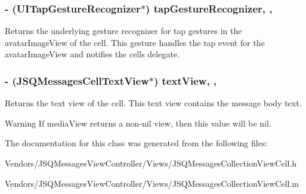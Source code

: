 \subsubsection[{tap\+Gesture\+Recognizer}]{\setlength{\rightskip}{0pt plus 5cm}-\/ (U\+I\+Tap\+Gesture\+Recognizer$\ast$) tap\+Gesture\+Recognizer\hspace{0.3cm}{\ttfamily [read]}, {\ttfamily [nonatomic]}, {\ttfamily [weak]}}\label{interface_j_s_q_messages_collection_view_cell_a64f75d9084b7476a7a2646b14eff105a}
Returns the underlying gesture recognizer for tap gestures in the avatar\+Image\+View of the cell. This gesture handles the tap event for the avatar\+Image\+View and notifies the cell\textquotesingle{}s delegate. \hypertarget{interface_j_s_q_messages_collection_view_cell_ac6168dfa70a2239ff4633552c5bfe87a}{}
\subsubsection[{text\+View}]{\setlength{\rightskip}{0pt plus 5cm}-\/ ({\bf J\+S\+Q\+Messages\+Cell\+Text\+View}$\ast$) text\+View\hspace{0.3cm}{\ttfamily [read]}, {\ttfamily [nonatomic]}, {\ttfamily [weak]}}\label{interface_j_s_q_messages_collection_view_cell_ac6168dfa70a2239ff4633552c5bfe87a}
Returns the text view of the cell. This text view contains the message body text.

\begin{DoxyWarning}{Warning}
If media\+View returns a non-\/nil view, then this value will be {\ttfamily nil}. 
\end{DoxyWarning}


The documentation for this class was generated from the following files\+:\begin{DoxyCompactItemize}
\item 
Vendors/\+J\+S\+Q\+Messages\+View\+Controller/\+Views/J\+S\+Q\+Messages\+Collection\+View\+Cell.\+h\item 
Vendors/\+J\+S\+Q\+Messages\+View\+Controller/\+Views/J\+S\+Q\+Messages\+Collection\+View\+Cell.\+m\end{DoxyCompactItemize}

